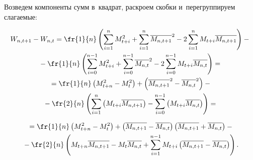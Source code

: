     Возведем компоненты сумм в~квадрат, раскроем скобки и~перегруппируем слагаемые:


    \begin{multline*}


        W_{n,t+1} - W_{n,t} = \fr{1}{n}\left(\sum\limits^{n}_{i=1}M^2_{t+i} +


         \sum\limits^{n}_{i=1}\overline{M_{n,t+1}}^2 -


         2\sum\limits^{n}_{i=1}M_{t+i}\overline{M_{n,t+1}}\right) -{} \\


         {}- \fr{1}{n}\left(\sum\limits^{n-1}_{i=0}M^2_{t+i} +


         \sum\limits^{n-1}_{i=0}\overline{M_{n,t}}^2 -


         2\sum\limits^{n-1}_{i=0}M_{t+i}\overline{M_{n,t}}\right) ={}\\


         {}=


            \fr{1}{n}\left(M^2_{t+n} - M^2_t\right) +


            \left(\overline{M_{n,t+1}}^2 - \overline{M_{n,t}}^2\right) -{} \\


            {}-  \fr{2}{n}\left(\sum\limits^{n}_{i=1}\left(M_{t+i}


            \overline{M_{n,t+1}}\right) - \sum\limits^{n-1}_{i=0}


            \left(M_{t+i}\overline{M_{n,t}}\right)\right) ={}


            \end{multline*}





\noindent


\begin{multline*}


            {}=


            \fr{1}{n}\left(M^2_{t+n} - M^2_t\right) +


            \left(\overline{M_{n,t+1}} - \overline{M_{n,t}}\right)\left(


            \overline{M_{n,t+1}} + \overline{M_{n,t}}\right) - {}\\


            {}- \fr{2}{n}\left(M_{t+n}\overline{M_{n,t+1}} -


            M_t\overline{M_{n,t}} + \sum\limits^{n-1}_{i=1}M_{t+i}\left(


            \overline{M_{n,t+1}} - \overline{M_{n,t}}\right)\right).


    \end{multline*}





